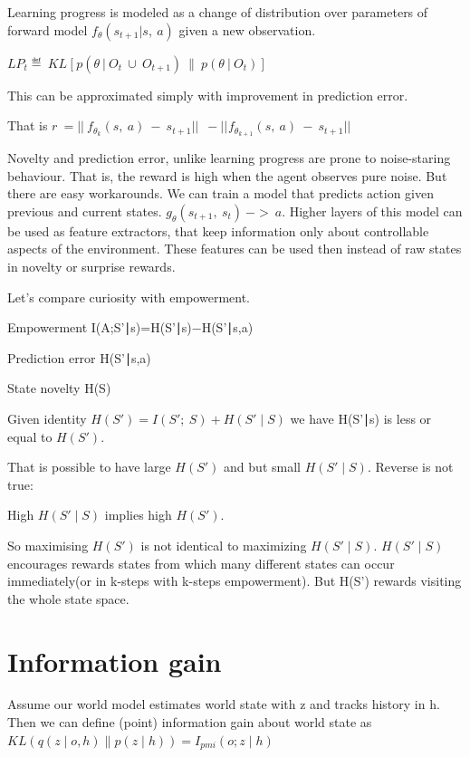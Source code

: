 Learning progress is modeled as a change of distribution over parameters of forward model $f_{\theta}(s_{t + 1}|s,\ a)$ given a new observation.

$LP_{t} ≝ \ KL\ \lbrack\ p(\theta\ |\ O_{t}\  \cup \ O_{t + 1})\ \|\ p(\theta\ |\ O_{t})\ \rbrack$

This can be approximated simply with improvement in prediction error.

That is $r\  = ||\ f_{\theta_{k}}(s,\ a)\  - \ s_{t + 1}||_{}\ \  - ||_{}f_{\theta_{k + 1}}(s,\ a)\  - \ s_{t + 1}||_{}$

Novelty and prediction error, unlike learning progress are prone to noise-staring behaviour. That is, the reward is high when the agent observes pure noise. But there are easy workarounds. We can train a model that predicts action given previous and current states. $g_{\theta}(s_{t + 1},\ s_{t})\  - > \ a$. Higher layers of this model can be used as feature extractors, that keep information only about controllable aspects of the environment. These features can be used then instead of raw states in novelty or surprise rewards.

Let's compare curiosity with empowerment.

Empowerment I(A;S'∣s)=H(S'∣s)−H(S'∣s,a)

Prediction error H(S'∣s,a)

State novelty H(S)

Given identity $H(S') = I(S';\ S) + H(S' \mid S)$ we have H(S'∣s) is less or equal to $H(S')$.

That is possible to have large $H(S')$ and but small $H(S' \mid S)$. Reverse is not true:

High $H(S' \mid S)$ implies high $H(S')$.

So maximising $H(S')$ is not identical to maximizing $H(S' \mid S)$. $H(S' \mid S)$ encourages rewards states from which many different states can occur immediately(or in k-steps with k-steps empowerment). But H(S') rewards visiting the whole state space.

\section{Information gain}\label{information-gain}

Assume our world model estimates world state with z and tracks history in h. Then we can define (point) information gain about world state as \\
$KL(q(z \mid o, h) \parallel p(z \mid h)) = I_{pmi}(o; z \mid h)$

